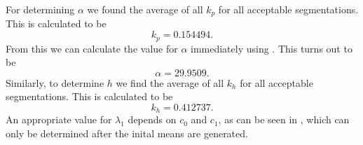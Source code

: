 \documentclass[10pt, journal, letterpaper, onecolumn, draftcls]{IEEEtran}
\begin{document}

For determining $\alpha$ we found the average of all $k_p$ for all acceptable segmentations. This is calculated to be
\begin{equation*}
	k_p = 0.154494.
\end{equation*}
From this we can calculate the value for $\alpha$ immediately using . This turns out to be
\begin{equation}
	\alpha = 29.9509.
\end{equation}
Similarly, to determine $h$ we find the average of all $k_h$ for all acceptable segmentations. This is calculated to be
\begin{equation*}
	k_h = 0.412737.
\end{equation*}
An appropriate value for $\lambda_1$ depends on $c_0$ and $c_1$, as can be seen in , which can only be determined after the inital means are generated.

\end{document}
